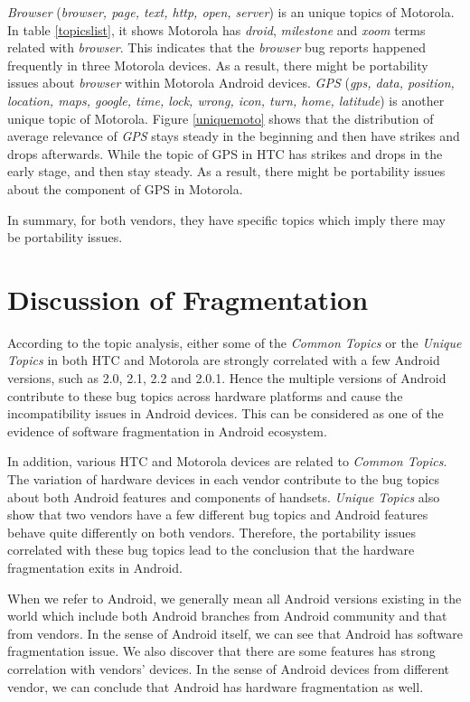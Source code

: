 \documentclass[10pt, conference, compsocconf]{IEEEtran}
\begin{document}
\textit{Browser} (\textit{browser, page, text, http, open, server}) is
an unique topics of Motorola. In table \ref{topicslist}, it shows
Motorola has \textit{droid}, \textit{milestone} and \textit{xoom}
terms related with \textit{browser}. This indicates that the
\textit{browser} bug reports happened frequently in three Motorola
devices. As a result, there might be portability issues about
\textit{browser} within Motorola Android devices. \textit{GPS}
(\textit{gps, data, position, location, maps, google, time, lock,
  wrong, icon, turn, home, latitude}) is another unique topic of
Motorola. Figure \ref{uniquemoto} shows that the distribution of
average relevance of \textit{GPS} stays steady in the beginning and
then have strikes and drops afterwards. While the topic of GPS in HTC
has strikes and drops in the early stage, and then stay steady. As a
result, there might be portability issues about the component of GPS
in Motorola.

In summary, for both vendors, they have specific topics which imply there may be portability issues.

\section{Discussion of Fragmentation}
\label{sec:fragmentation}

According to the topic analysis, either some of the \textit{Common
  Topics} or the \textit{Unique Topics} in both HTC and Motorola are
strongly correlated with a few Android versions, such as 2.0, 2.1, 2.2
and 2.0.1. Hence the multiple versions of Android contribute to these
bug topics across hardware platforms and cause the incompatibility
issues in Android devices. This can be considered as one of the
evidence of software fragmentation in Android ecosystem.


In addition, various HTC and Motorola devices are related to
\textit{Common Topics}. The variation of hardware devices in each
vendor contribute to the bug topics about both Android features and
components of handsets. \textit{Unique Topics} also show that two
vendors have a few different bug topics and Android features behave
quite differently on both vendors. Therefore, the portability issues
correlated with these bug topics lead to the conclusion that the
hardware fragmentation exits in Android.


When we refer to Android, we generally mean all Android versions
existing in the world which include both Android branches from Android
community and that from vendors. In the sense of Android itself, we
can see that Android has software fragmentation issue. We also
discover that there are some features has strong correlation with
vendors' devices. In the sense of Android devices from different
vendor, we can conclude that Android has hardware fragmentation as
well.
\end{document}
